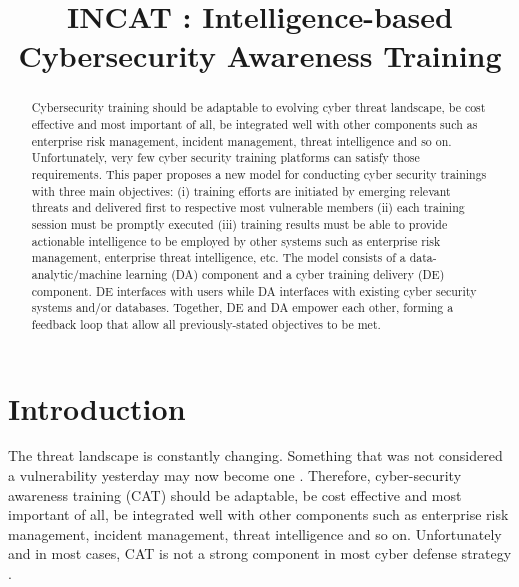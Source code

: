 \documentclass[conference]{IEEEtran}
\begin{document}
\title{INCAT : Intelligence-based Cybersecurity Awareness Training
}


\author{
}

\maketitle

\begin{abstract}
Cybersecurity training should be adaptable to evolving cyber threat landscape, be cost effective and most important of all, be integrated well with other components such as enterprise risk management, incident management, threat intelligence and so on. Unfortunately, very few cyber security training platforms can satisfy those requirements. This paper proposes a new model for conducting cyber security trainings with three main objectives: (i) training efforts are initiated by emerging relevant threats and delivered first to respective most vulnerable members (ii) each training session must be
promptly executed (iii) training results must be able to provide actionable intelligence to be employed by other systems such as enterprise risk management, enterprise threat intelligence, etc. The model consists of a data-analytic/machine learning (DA) component and a cyber training delivery (DE) component. DE interfaces with users while DA interfaces with existing cyber security systems and/or databases. Together, DE and DA empower each other, forming a feedback loop that allow all previously-stated objectives to be met.
\end{abstract}





%
\IEEEpeerreviewmaketitle

\section{Introduction}
The threat landscape is constantly changing. Something that was not considered a vulnerability yesterday may now become one \cite{Manadhata2011AnMetric}. Therefore, cyber-security awareness training (CAT) should be adaptable, be cost effective and most important of all, be integrated well with other components such as enterprise risk management, incident management, threat intelligence and so on. Unfortunately and in most cases, CAT is not a strong component in most cyber defense strategy \cite{Jakoubi2009AManagement}.
\end{document}
